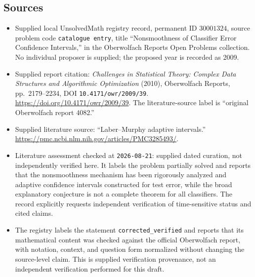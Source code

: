 \documentclass[11pt]{article}
\begin{document}
\subsection{Sources}
\begin{itemize}
\item Supplied local UnsolvedMath registry record, permanent ID \(30001324\), source problem code \texttt{catalogue entry}, title ``Nonsmoothness of Classifier Error Confidence Intervals,'' in the Oberwolfach Reports Open Problems collection. No individual proposer is supplied; the proposed year is recorded as 2009.
\item Supplied report citation: \emph{Challenges in Statistical Theory: Complex Data Structures and Algorithmic Optimization} (2010), Oberwolfach Reports, pp.~2179--2234, DOI \texttt{10.4171/owr/2009/39}. \url{https://doi.org/10.4171/owr/2009/39}. The literature-source label is ``original Oberwolfach report 4082.''
\item Supplied literature source: ``Laber--Murphy adaptive intervals.'' \url{https://pmc.ncbi.nlm.nih.gov/articles/PMC3285493/}.
\item Literature assessment checked at \texttt{2026-08-21}: supplied dated curation, not independently verified here. It labels the problem partially solved and reports that the nonsmoothness mechanism has been rigorously analyzed and adaptive confidence intervals constructed for test error, while the broad explanatory conjecture is not a complete theorem for all classifiers. The record explicitly requests independent verification of time-sensitive status and cited claims.
\item The registry labels the statement \texttt{corrected\_verified} and reports that its mathematical content was checked against the official Oberwolfach report, with notation, context, and question form normalized without changing the source-level claim. This is supplied verification provenance, not an independent verification performed for this draft.
\end{itemize}
\end{document}
